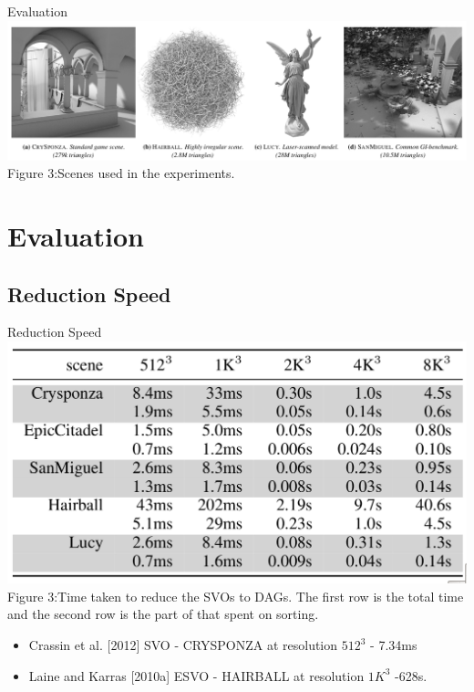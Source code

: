 \documentclass{beamer}
\begin{document}
\begin{frame}{Evaluation}
	\includegraphics[scale=0.26]{images/scenes.png}{\\Figure 3:Scenes used in the experiments.}
\end{frame}

\section{Evaluation}
\subsection{Reduction Speed}
\begin{frame}{Reduction Speed}
	\includegraphics[scale=0.23]{images/red-speed.png}{\\Figure 3:Time taken to reduce the SVOs to DAGs. The first row is the total time and the second row is the part of that spent on sorting.}
	\begin{itemize}
		\item Crassin et al. [2012] SVO - CRYSPONZA at resolution $512^3$ - 7.34ms
		\item Laine and Karras [2010a] ESVO - HAIRBALL at resolution $1K^3$ -628s.
	\end{itemize}
	
	
\end{frame}
\end{document}
